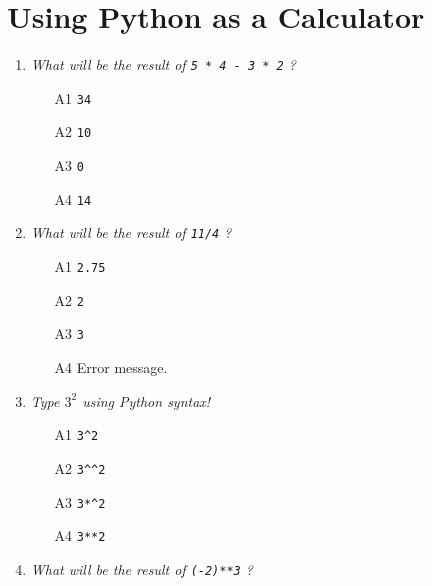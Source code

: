 
\section{Using Python as a Calculator}

\begin{enumerate}

\item {\em What will be the result of {\tt 5 * 4 - 3 * 2} ?}\\

\begin{enumerate}
\item[A1] {\tt 34}
\item[A2] {\tt 10}
\item[A3] {\tt 0}
\item[A4] {\tt 14}
\end{enumerate}

\vspace{6mm}

\item {\em What will be the result of {\tt 11/4} ?}\\

\begin{enumerate}
\item[A1] {\tt 2.75}
\item[A2] {\tt 2}
\item[A3] {\tt 3}
\item[A4] Error message.
\end{enumerate}

\vspace{6mm}

\item {\em Type $3^2$ using Python syntax!}\\

\begin{enumerate}
\item[A1] {\tt 3\^{}2}
\item[A2] {\tt 3\^{}\^{}2}
\item[A3] {\tt 3*\^{}2}
\item[A4] {\tt 3**2}
\end{enumerate}

\vspace{6mm}

\item {\em What will be the result of {\tt (-2)**3} ?}\\


\end{enumerate}
